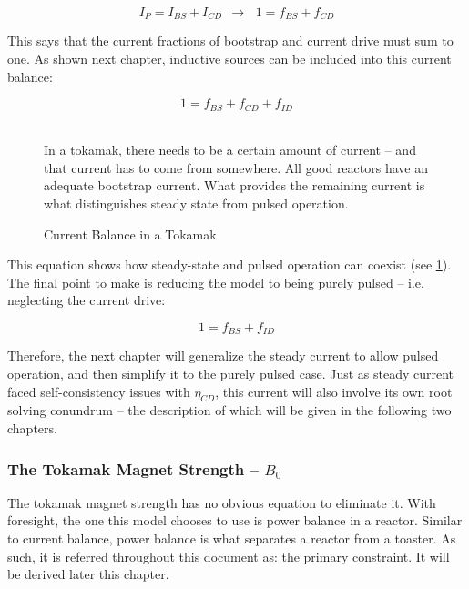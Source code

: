 \begin{equation}
	I_P = I_{BS} + I_{CD} \ \ \rightarrow \, \ \ 1 = f_{BS} + f_{CD}
\end{equation}

This says that the current fractions of bootstrap and current drive must sum to one. As shown next chapter, inductive sources can be included into this current balance:

\begin{equation}
	\label{eq:ifbal}
	1 = f_{BS} + f_{CD} + f_{ID}
\end{equation}

\begin{figure}
	\centering
	\begin{adjustbox}{width=0.75\textwidth}
		
	\end{adjustbox}
	\caption{Current Balance in a Tokamak} ~\\
	\small In a tokamak, there needs to be a certain amount of current -- and that current has to come from somewhere. All good reactors have an adequate bootstrap current. What provides the remaining current is what distinguishes steady state from pulsed operation.
	\label{fig:curbal}
\end{figure}

This equation shows how steady-state and pulsed operation can coexist (see \cref{fig:curbal}). The final point to make is reducing the model to being purely pulsed -- i.e. neglecting the current drive:

\begin{equation}
	1 = f_{BS} + f_{ID}
\end{equation}

Therefore, the next chapter will generalize the steady current to allow pulsed operation, and then simplify it to the purely pulsed case. Just as steady current faced self-consistency issues with $\eta_{CD}$, this current will also involve its own root solving conundrum -- the description of which will be given in the following two chapters.

\subsubsection{The Tokamak Magnet Strength -- $B_0$}

The tokamak magnet strength has no obvious equation to eliminate it. With foresight, the one this model chooses to use is power balance in a reactor. Similar to current balance, power balance is what separates a reactor from a toaster. As such, it is referred throughout this document as: the primary constraint. It will be derived later this chapter.

